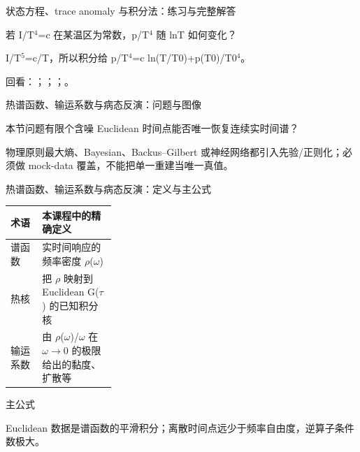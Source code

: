 \begin{frame}[t]{状态方程、trace anomaly 与积分法：练习与完整解答}
\footnotesize
\begin{block}{}若 I/\allowbreak{}T\ensuremath{^{4}}=c 在某温区为常数，p/\allowbreak{}T\ensuremath{^{4}} 随 lnT 如何变化？\end{block}
\begin{exampleblock}{}I/\allowbreak{}T\ensuremath{^{5}}=c/\allowbreak{}T，所以积分给 p/\allowbreak{}T\ensuremath{^{4}}=c ln(T/\allowbreak{}T0)+p(T0)/\allowbreak{}T0\ensuremath{^{4}}。\end{exampleblock}
\vfill
\scriptsize 回看：；；；。
\end{frame}

\begin{frame}[t]{热谱函数、输运系数与病态反演：问题与图像}
\footnotesize
\begin{block}{本节问题}有限个含噪 Euclidean 时间点能否唯一恢复连续实时间谱？\end{block}
\begin{block}{物理原则}\quad 最大熵、Bayesian、Backus--Gilbert 或神经网络都引入先验/\allowbreak{}正则化；必须做 mock-data 覆盖，不能把单一重建当唯一真值。\end{block}
\end{frame}

\begin{frame}[t]{热谱函数、输运系数与病态反演：定义与主公式}
\footnotesize\begin{tabularx}{\linewidth}{p{0.30\linewidth}Y}
\toprule 术语 & 本课程中的精确定义\\\midrule
{} 谱函数 & 实时间响应的频率密度 \ensuremath{\rho}(\ensuremath{\omega})\\
 热核 & 把 \ensuremath{\rho} 映射到 Euclidean G(\ensuremath{\tau}) 的已知积分核\\
 输运系数 & 由 \ensuremath{\rho}(\ensuremath{\omega})/\allowbreak{}\ensuremath{\omega} 在 \ensuremath{\omega}\ensuremath{\rightarrow}0 的极限给出的黏度、扩散等\\
\bottomrule\end{tabularx}\vspace{0.15cm}
\begin{block}{ 主公式}\centering{}\end{block}
Euclidean 数据是谱函数的平滑积分；离散时间点远少于频率自由度，逆算子条件数极大。
\end{frame}

